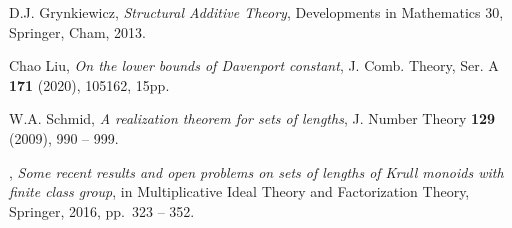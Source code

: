 \documentclass[a4paper,10pt]{amsart}
\theoremstyle{plain}
\theoremstyle{definition}
\numberwithin{equation}{section}
\begin{document}
\begin{thebibliography}{10}
D.J. Grynkiewicz, \emph{Structural {A}dditive {T}heory}, Developments in
  Mathematics 30, Springer, Cham, 2013.

Chao Liu, \emph{On the lower bounds of {D}avenport constant}, J. Comb. Theory,
  Ser. A \textbf{171} (2020), {105162, 15pp}.

W.A. Schmid, \emph{A realization theorem for sets of lengths}, J. Number Theory
  \textbf{129} (2009), 990 -- 999.

\bysame, \emph{Some recent results and open problems on sets of lengths of
  {K}rull monoids with finite class group}, in Multiplicative {I}deal {T}heory
  and {F}actorization {T}heory, Springer, 2016, pp.~323 -- 352.

\end{thebibliography}
\end{document}
